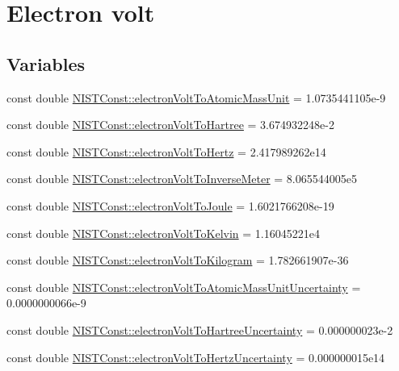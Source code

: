 \hypertarget{group___electron_volt}{}\section{Electron volt}
\label{group___electron_volt}
\subsection*{Variables}
\begin{DoxyCompactItemize}
\item 
const double \hyperlink{group___electron_volt_gabd56c1195e7ce2bb9c314e88b43e30ab}{N\+I\+S\+T\+Const\+::electron\+Volt\+To\+Atomic\+Mass\+Unit} = 1.\+0735441105e-\/9
\item 
const double \hyperlink{group___electron_volt_gab05ba497cc5a6bd566356469e9de003a}{N\+I\+S\+T\+Const\+::electron\+Volt\+To\+Hartree} = 3.\+674932248e-\/2
\item 
const double \hyperlink{group___electron_volt_gae80c1242d33bf681a09a87d20cd4162e}{N\+I\+S\+T\+Const\+::electron\+Volt\+To\+Hertz} = 2.\+417989262e14
\item 
const double \hyperlink{group___electron_volt_ga4c109b95727a76ae489a8dec36a88b65}{N\+I\+S\+T\+Const\+::electron\+Volt\+To\+Inverse\+Meter} = 8.\+065544005e5
\item 
const double \hyperlink{group___electron_volt_ga51a94280936d8d7e92cbac054e1df485}{N\+I\+S\+T\+Const\+::electron\+Volt\+To\+Joule} = 1.\+6021766208e-\/19
\item 
const double \hyperlink{group___electron_volt_ga9cd0e681c5b9edabd2f1840c88d90176}{N\+I\+S\+T\+Const\+::electron\+Volt\+To\+Kelvin} = 1.\+16045221e4
\item 
const double \hyperlink{group___electron_volt_ga21481a673cb040e04f7f8f95581ece0c}{N\+I\+S\+T\+Const\+::electron\+Volt\+To\+Kilogram} = 1.\+782661907e-\/36
\item 
const double \hyperlink{group___electron_volt_ga0f93985ef9b7a71e0c1e6172d6d041a5}{N\+I\+S\+T\+Const\+::electron\+Volt\+To\+Atomic\+Mass\+Unit\+Uncertainty} = 0.\+0000000066e-\/9
\item 
const double \hyperlink{group___electron_volt_ga0abfaf6edc874d80488beab0633f353a}{N\+I\+S\+T\+Const\+::electron\+Volt\+To\+Hartree\+Uncertainty} = 0.\+000000023e-\/2
\item 
const double \hyperlink{group___electron_volt_ga78145ffd31aff9041a59d939ce3162d4}{N\+I\+S\+T\+Const\+::electron\+Volt\+To\+Hertz\+Uncertainty} = 0.\+000000015e14
\item 

\end{DoxyCompactItemize}
